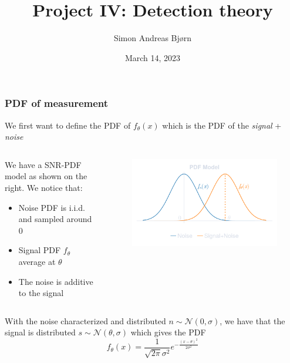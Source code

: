 \documentclass[compress,aspectratio=169]{beamer}
\title{Project IV: Detection theory}
\subtitle{}
\author{Simon Andreas Bjørn}
\date{March 14, 2023}
\begin{document}
\begin{frame}
    \maketitle
\end{frame}

\begin{frame} %
    \frametitle{PDF of measurement}
    We first want to define the PDF of $f_\theta\left(x\right)$ which is the
    PDF of the {\em signal} + {\em noise}
    \begin{columns}
        \begin{column}{0.5\textwidth}
            We have a SNR-PDF model as shown on the right.
            We notice that:
            \begin{itemize}
                \item Noise PDF is i.i.d. and sampled around 0
                \item Signal PDF $f_\theta$ average at $\theta$
                \item The noise is additive to the signal
            \end{itemize}
        \end{column}
        \begin{column}{0.5\textwidth}
            \begin{figure}
                \includegraphics[width=\columnwidth]{"../PDFs.pdf"}
            \end{figure}
        \end{column}
    \end{columns}
    With the noise characterized and distributed $n \sim \mathcal{N}\left(0,\sigma\right)$, we have that
    the signal is distributed $s \sim \mathcal{N}\left(\theta,\sigma\right)$
    which gives the PDF
    \begin{equation*}
        f_\theta (x) = \frac{1}{\sqrt{2\pi}\sigma^2}e^{-\frac{\left(x-\theta\right)^2}{2\sigma^2}}
    \end{equation*}
\end{frame} %
\end{document}
